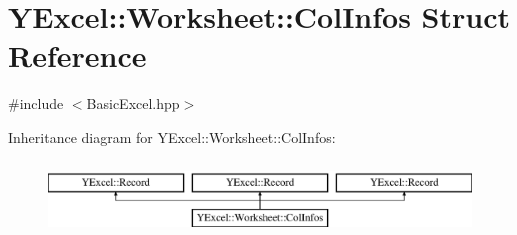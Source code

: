 \hypertarget{struct_y_excel_1_1_worksheet_1_1_col_infos}{}\section{Y\+Excel\+:\+:Worksheet\+:\+:Col\+Infos Struct Reference}
\label{struct_y_excel_1_1_worksheet_1_1_col_infos}


{\ttfamily \#include $<$Basic\+Excel.\+hpp$>$}

Inheritance diagram for Y\+Excel\+:\+:Worksheet\+:\+:Col\+Infos\+:\begin{figure}[H]
\begin{center}
\leavevmode
\includegraphics[height=2.000000cm]{struct_y_excel_1_1_worksheet_1_1_col_infos}
\end{center}
\end{figure}
